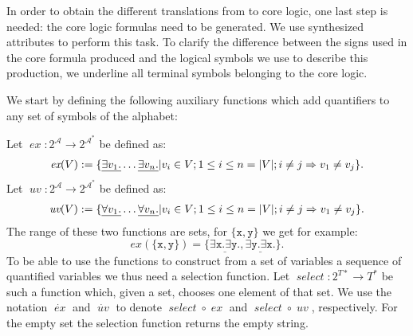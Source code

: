In order to obtain the different translations from \nthree to core logic, 
one last step is needed: the core logic formulas need to be generated. %
We use synthesized attributes to perform this task. To clarify the difference between the signs used in the core formula produced and the
logical symbols we use to describe this production, we underline all terminal symbols belonging to the core logic. 

We start by defining the following auxiliary functions 
which add quantifiers to any set of symbols of the alphabet: %

Let $\operatorname{\textit{ex}}: 2^\mathcal{A}\rightarrow 2^{\mathcal{A}^*}$ be defined as:
\begin{multline}\notag \operatorname{\textit{ex}}(V):= \{\underline{\exists v_1.}\ldots \underline{\exists v_n.}| v_i \in V; 1\leq i \leq n=|V|; i\neq j \Rightarrow v_1 \neq v_j\}.\end{multline}
%
Let $\operatorname{\textit{uv}}: 2^\mathcal{A}\rightarrow 2^{\mathcal{A}^*}$ be defined as:
\begin{multline}\notag \operatorname{\textit{uv}}(V):= \{\underline{\forall v_1.}\ldots \underline{\forall v_n.}| v_i \in V; 1\leq i \leq n=|V|; i\neq j \Rightarrow v_1 \neq v_j\}.
\end{multline}
%
The range of these two functions are sets, for $\{\texttt{x}, \texttt{y}\}$ we get for example:
\[\textit{ex}(\{\texttt{x}, \texttt{y}\})=\{ \underline{\exists \texttt{x}.\exists \texttt{y}.}, \underline{\exists \texttt{y}.\exists \texttt{x}.}\}.\]
To be able to use the functions to construct from a set of variables a sequence of quantified variables we thus need a selection function.
Let $\operatorname{\textit{select}}: 2^{T*}\rightarrow T^*$ be such a function which, given a set, chooses one element of that set.
We use the notation $\dot{\operatorname{\textit{ex}}}$ and $\dot{\operatorname{\textit{uv}}}$ to denote 
$\operatorname{\textit{select}}\circ \operatorname{\textit{ex}}$ and $\operatorname{\textit{select}}\circ \operatorname{\textit{uv}}$,
respectively. For the empty set the selection function returns the empty string.

